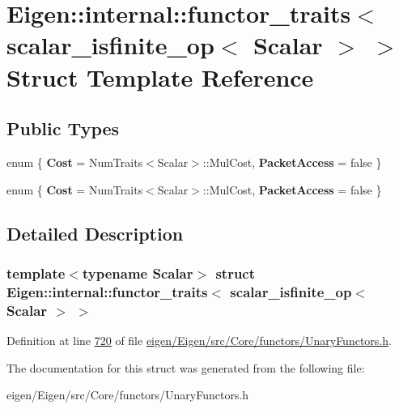 \hypertarget{struct_eigen_1_1internal_1_1functor__traits_3_01scalar__isfinite__op_3_01_scalar_01_4_01_4}{}\section{Eigen\+:\+:internal\+:\+:functor\+\_\+traits$<$ scalar\+\_\+isfinite\+\_\+op$<$ Scalar $>$ $>$ Struct Template Reference}
\label{struct_eigen_1_1internal_1_1functor__traits_3_01scalar__isfinite__op_3_01_scalar_01_4_01_4}
\subsection*{Public Types}
\begin{DoxyCompactItemize}
\item 
\mbox{\label{struct_eigen_1_1internal_1_1functor__traits_3_01scalar__isfinite__op_3_01_scalar_01_4_01_4_ab139cebf4d07ac0abd439a962e086fc2}} 
enum \{ {\bfseries Cost} = Num\+Traits$<$Scalar$>$\+:\+:Mul\+Cost, 
{\bfseries Packet\+Access} = false
 \}
\item 
\mbox{\label{struct_eigen_1_1internal_1_1functor__traits_3_01scalar__isfinite__op_3_01_scalar_01_4_01_4_ad99df006573861a492a7130a8c37dc15}} 
enum \{ {\bfseries Cost} = Num\+Traits$<$Scalar$>$\+:\+:Mul\+Cost, 
{\bfseries Packet\+Access} = false
 \}
\end{DoxyCompactItemize}


\subsection{Detailed Description}
\subsubsection*{template$<$typename Scalar$>$\newline
struct Eigen\+::internal\+::functor\+\_\+traits$<$ scalar\+\_\+isfinite\+\_\+op$<$ Scalar $>$ $>$}



Definition at line \hyperlink{eigen_2_eigen_2src_2_core_2functors_2_unary_functors_8h_source_l00720}{720} of file \hyperlink{eigen_2_eigen_2src_2_core_2functors_2_unary_functors_8h_source}{eigen/\+Eigen/src/\+Core/functors/\+Unary\+Functors.\+h}.



The documentation for this struct was generated from the following file\+:\begin{DoxyCompactItemize}
\item 
eigen/\+Eigen/src/\+Core/functors/\+Unary\+Functors.\+h\end{DoxyCompactItemize}

